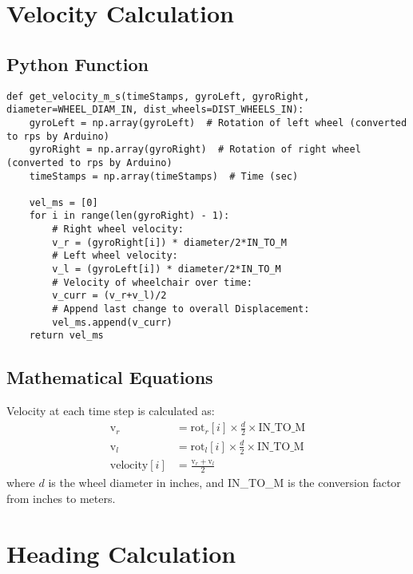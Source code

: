 \documentclass{article}
\begin{document}
\section{Velocity Calculation}

\subsection{Python Function}
\begin{lstlisting}
def get_velocity_m_s(timeStamps, gyroLeft, gyroRight, diameter=WHEEL_DIAM_IN, dist_wheels=DIST_WHEELS_IN):
    gyroLeft = np.array(gyroLeft)  # Rotation of left wheel (converted to rps by Arduino)
    gyroRight = np.array(gyroRight)  # Rotation of right wheel (converted to rps by Arduino)
    timeStamps = np.array(timeStamps)  # Time (sec)

    vel_ms = [0]
    for i in range(len(gyroRight) - 1):
        # Right wheel velocity:
        v_r = (gyroRight[i]) * diameter/2*IN_TO_M
        # Left wheel velocity:
        v_l = (gyroLeft[i]) * diameter/2*IN_TO_M
        # Velocity of wheelchair over time:
        v_curr = (v_r+v_l)/2
        # Append last change to overall Displacement:
        vel_ms.append(v_curr)
    return vel_ms
\end{lstlisting}

\subsection{Mathematical Equations}
Velocity at each time step is calculated as:
\begin{align*}
\text{v}_r &= \text{rot}_r[i] \times \frac{d}{2} \times \text{IN\_TO\_M} \\
\text{v}_l &= \text{rot}_l[i] \times \frac{d}{2} \times \text{IN\_TO\_M} \\
\text{velocity}[i] &= \frac{\text{v}_r + \text{v}_l}{2}
\end{align*}
where $d$ is the wheel diameter in inches, and IN\_TO\_M is the conversion factor from inches to meters.

\section{Heading Calculation}
\end{document}
